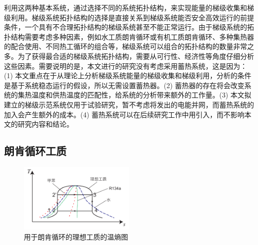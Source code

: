 利用这两种基本系统，通过选择不同的系统拓扑结构，来实现能量的梯级收集和梯级利用。梯级系统拓扑结构的选择是直接关系到梯级系统能否安全高效运行的前提条件，一个具有不合理拓扑结构的梯级系统甚至不能正常运行。由于梯级系统的拓扑结构需要考虑多种因素，例如水工质朗肯循环或有机工质朗肯循环、多种集热器的配合使用、不同热工循环的组合等，梯级系统可以组合的拓扑结构的数量非常之多。为了获得最合适的梯级系统拓扑结构，需要从可行性、经济性等角度仔细分析这些因素。需要说明的是，本文进行的研究没有考虑采用蓄热系统，这是因为：(1) 本文重点在于从理论上分析梯级系统能量的梯级收集和梯级利用，分析的条件是基于系统稳态运行的假设，所以无需设置蓄热器。(2) 蓄热器的存在将会改变系统的集热温度和供热温度的匹配性，给系统的分析带来额外的工作量。(3) 本文拟建立的梯级示范系统仅用于试验研究，暂不考虑将发出的电能并网，而蓄热系统的加入会产生额外的成本。(4) 蓄热系统可以在后续研究工作中用引入，而不影响本文的研究内容和结论。

\subsection{朗肯循环工质}
\label{sec:RankineCycleFluid}

\begin{figure}[!ht]
\centering 
\includegraphics[width=0.5\textwidth]{fig/idealTs}
\caption{用于朗肯循环的理想工质的温熵图}
\label{fig:idealTs}
\end{figure}

